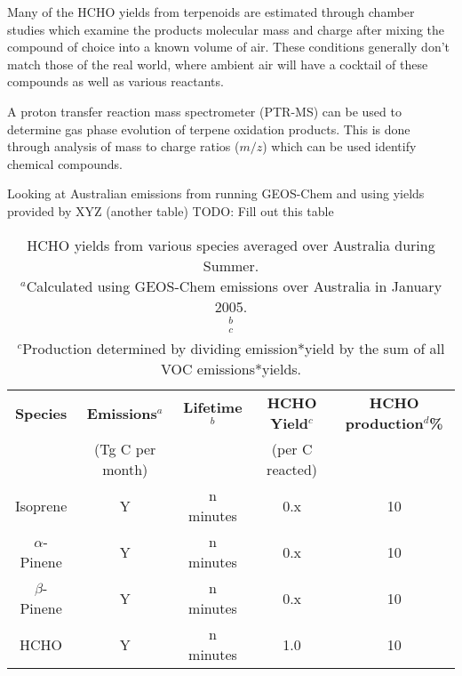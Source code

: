     Many of the HCHO yields from terpenoids are estimated through chamber studies which examine the products molecular mass and charge after mixing the compound of choice into a known volume of air.
    These conditions generally don't match those of the real world, where ambient air will have a cocktail of these compounds as well as various reactants.
    
    A proton transfer reaction mass spectrometer (PTR-MS) can be used to determine gas phase evolution of terpene oxidation products.
    This is done through analysis of mass to charge ratios ($m/z$) which can be used identify chemical compounds.
    
    Looking at Australian emissions from running GEOS-Chem and using yields provided by XYZ (another table)
    TODO: Fill out this table
    \begin{table}
    \begin{tabular}{ | c  c  c  c  c | }
      \hline
      \textbf{Species} & \textbf{Emissions$^a$} & \textbf{Lifetime$^b$} & \textbf{HCHO Yield$^c$} & \textbf{HCHO production$^d$\%}
      \\               & (Tg C per month)       &                       & (per C reacted)         &         \\ \hline
      Isoprene           & Y                     & n minutes            & 0.x                & 10       \\
      $\alpha$-Pinene    & Y                     & n minutes            & 0.x                & 10        \\ %
      $\beta$-Pinene     & Y                     & n minutes            & 0.x                & 10        \\
      HCHO               & Y                     & n minutes            & 1.0                & 10         \\ \hline
    \end{tabular}
    \caption{HCHO yields from various species averaged over Australia during Summer. \hspace{\textwidth} \\ 
    ${}^a$Calculated using GEOS-Chem emissions over Australia in January 2005. \hspace{\textwidth} \\ 
    ${}^b$ \hspace{\textwidth} \\ 
    ${}^c$ \hspace{\textwidth} \\ 
    ${}^c$Production determined by dividing emission*yield by the sum of all VOC emissions*yields. \hspace{\textwidth} \\ 
    }
    \label{ch_HCHO:tab:VOCAusYields}
    \end{table}
    

